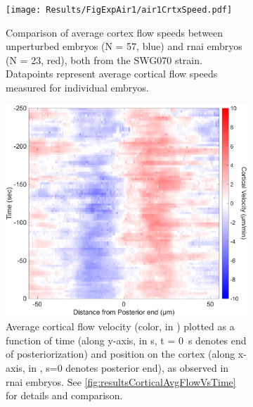 \begin{figure}
\centering
\begin{subfigure}[t]{0.25\textwidth}
    \centering
    \texttt{[image: Results/FigExpAir1/air1CrtxSpeed.pdf]}
    \caption{Comparison of average cortex flow speeds between unperturbed embryos (N = 57, blue) and  \ac{rnai} embryos (N = 23, red), both from the SWG070 strain. Datapoints represent average cortical flow speeds measured for individual embryos.} 
    \label{subfig:swg070Air1CrtxFlow-avgSpeed}
\end{subfigure}
\hfill
\begin{subfigure}[t]{0.3\textwidth}
    \centering
    \includegraphics[width=\textwidth]{Results/FigExpAir1/crtxFlowTime.pdf}
    \caption{Average cortical flow velocity (color, in \si{\unitCrtxVel}) plotted as a function of time (along y-axis, in \si{\second}, t = \SI{0}{\second} denotes end of posteriorization) and position on the cortex (along x-axis, in \si{\unitLength}, s=\SI{0}{\unitLength} denotes posterior end), as observed in  \ac{rnai} embryos. See \autoref{fig:resultsCorticalAvgFlowVsTime} for details and comparison.} 
    \label{subfig:swg070Air1CrtxFlow-VsTime}
\end{subfigure}
\hfill
\begin{subfigure}[t]{0.3\textwidth}
    \centering

\end{subfigure}
\end{figure}
